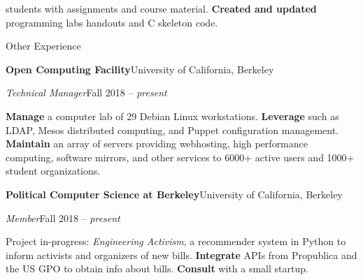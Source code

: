 \begin{minipage}[t]{0.665\textwidth}
\begin{adjustwidth}{10pt}{}
    \textbf{} students with assignments and course material.
    \textbf{Created and updated} programming labs handouts and C skeleton code.
  \end{adjustwidth}

  \vspace{10pt}

  {\sectionfont Other Experience}

  \vspace{5pt}
  \textbf{Open Computing Facility}\hfill University of California, Berkeley
  \begin{adjustwidth}{10pt}{}
    \emph{Technical Manager}\hfill Fall 2018 -- \emph{present}

    \textbf{Manage} a computer lab of 29 Debian Linux workstations.
    \textbf{Leverage}  such as LDAP, Mesos distributed computing, and Puppet configuration management.
    \textbf{Maintain} an array of servers providing webhosting, high performance computing, software mirrors, and other services to 6000+ active users and 1000+ student organizations.

  \end{adjustwidth}

  \vspace{5pt}
  \textbf{Political Computer Science at Berkeley}\hfill University of California, Berkeley
  \begin{adjustwidth}{10pt}{}
    \emph{Member}\hfill Fall 2018 -- \emph{present}

    Project in-progress: \emph{Engineering Activism}, a recommender system in Python to inform activists and organizers of new bills.
    \textbf{Integrate} APIs from Propublica and the US GPO to obtain info about bills.
    \textbf{Consult} with a small startup.
  \end{adjustwidth}





\end{minipage}
